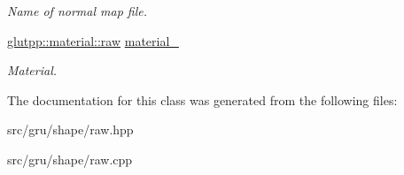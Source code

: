\begin{DoxyCompactItemize}
\begin{DoxyCompactList}\small\item\em \-Name of normal map file. \end{DoxyCompactList}\item 
\hypertarget{classglutpp_1_1shape_1_1Raw_aaf1eba77080eafbcbae0aafdf14b0f1d}{\hyperlink{structglutpp_1_1material_1_1raw}{glutpp\-::material\-::raw} \hyperlink{classglutpp_1_1shape_1_1Raw_aaf1eba77080eafbcbae0aafdf14b0f1d}{material\-\_\-}}\label{classglutpp_1_1shape_1_1Raw_aaf1eba77080eafbcbae0aafdf14b0f1d}

\begin{DoxyCompactList}\small\item\em \-Material. \end{DoxyCompactList}\end{DoxyCompactItemize}


\-The documentation for this class was generated from the following files\-:\begin{DoxyCompactItemize}
\item 
src/gru/shape/raw.\-hpp\item 
src/gru/shape/raw.\-cpp\end{DoxyCompactItemize}
